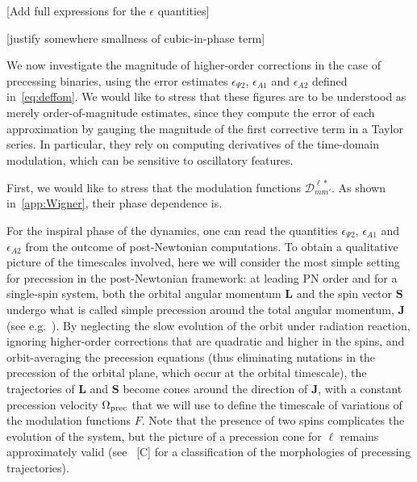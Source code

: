 \documentclass[aps,showpacs,twocolumn,
prd,superscriptaddress,nofootinbib]{revtex4-1}
\newcommand\calD{{\mathcal{D}}}
\newcommand{\SM}[1]{{\color{Red} #1}}
\begin{document}
\SM{[Add full expressions for the $\epsilon$ quantities]}

\SM{[justify somewhere smallness of cubic-in-phase term]}

We now investigate the magnitude of higher-order corrections in the case of precessing binaries, using the error estimates $\epsilon_{\Psi 2}$, $\epsilon_{A1}$ and $\epsilon_{A 2}$ defined in~\eqref{eq:deffom}. We would like to stress that these figures are to be understood as merely order-of-magnitude estimates, since they compute the error of each approximation by gauging the magnitude of the first corrective term in a Taylor series. In particular, they rely on computing derivatives of the time-domain modulation, which can be sensitive to oscillatory features.

First, we would like to stress that the modulation functions $\calD^{\ell *}_{mm'}$. As shown in~\ref{app:Wigner}, their phase dependence is.

For the inspiral phase of the dynamics, one can read the quantities $\epsilon_{\Psi 2}$, $\epsilon_{A1}$ and $\epsilon_{A 2}$ from the outcome of post-Newtonian computations. To obtain a qualitative picture of the timescales involved, here we will consider the most simple setting for precession in the post-Newtonian framework: at leading PN order and for a single-spin system, both the orbital angular momentum $\bm{L}$ and the spin vector $\bm{S}$ undergo what is called simple precession around the total angular momentum, $\bm{J}$ (see e.g.~\cite{Apostolatos+94, Kidder95}). By neglecting the slow evolution of the orbit under radiation reaction, ignoring higher-order corrections that are quadratic and higher in the spins, and orbit-averaging the precession equations (thus eliminating nutations in the precession of the orbital plane, which occur at the orbital timescale), the trajectories of $\bm{L}$ and $\bm{S}$ become cones around the direction of $\bm{J}$, with a constant precession velocity $\Omega_{\rm prec}$ that we will use to define the timescale of variations of the modulation functions $F$. Note that the presence of two spins complicates the evolution of the system, but the picture of a precession cone for $\bm{\ell}$ remains approximately valid (see~\cite{} \SM{[C]} for a classification of the morphologies of precessing trajectories).
\end{document}
